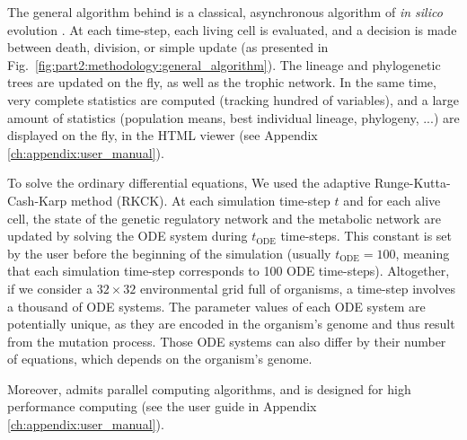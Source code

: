 The general algorithm behind {\EvoEvoSim} is a classical, asynchronous algorithm of \textit{in silico} evolution \citep{hindre-et-al-2012}. At each time-step, each living cell is evaluated, and a decision is made between death, division, or simple update (as presented in Fig.~\ref{fig:part2:methodology:general_algorithm}). The lineage and phylogenetic trees are updated on the fly, as well as the trophic network. In the same time, very complete statistics are computed (tracking hundred of variables), and a large amount of statistics (population means, best individual lineage, phylogeny, ...) are displayed on the fly, in the {\EvoEvoSim} HTML viewer (see Appendix \ref{ch:appendix:user_manual}).

To solve the ordinary differential equations, We used the adaptive Runge-Kutta-Cash-Karp method (RKCK). At each simulation time-step $t$ and for each alive cell, the state of the genetic regulatory network and the metabolic network are updated by solving the ODE system during $t_{\text{ODE}}$ time-steps. This constant is set by the user before the beginning of the simulation (usually $t_{\text{ODE}} = 100$, meaning that each simulation time-step corresponds to 100 ODE time-steps). Altogether, if we consider a $32 \times 32$ environmental grid full of organisms, a time-step involves a thousand of ODE systems. The parameter values of each ODE system are potentially unique, as they are encoded in the organism's genome and thus result from the mutation process. Those ODE systems can also differ by their number of equations, which depends on the organism's genome.

Moreover, {\EvoEvoSim} admits parallel computing algorithms, and is designed for high performance computing (see the user guide in Appendix \ref{ch:appendix:user_manual}).

